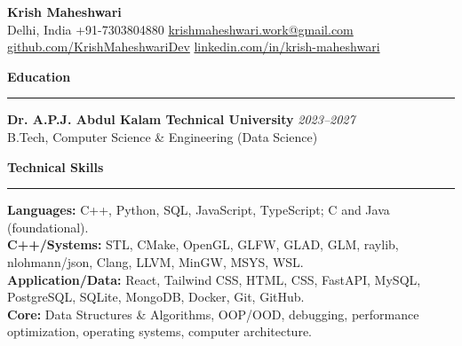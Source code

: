 \documentclass[11pt,a4paper]{article}
\newcommand{\sectionline}[1]{\vspace{6pt}\textbf{#1}\par\vspace{2pt}\hrule\vspace{3pt}}
\begin{document}
\pagestyle{empty}
\raggedright

{\Large\textbf{Krish Maheshwari}}\\
Delhi, India \textbar{} +91-7303804880 \textbar{} \href{mailto:krishmaheshwari.work@gmail.com}{krishmaheshwari.work@gmail.com}\\
\href{https://github.com/KrishMaheshwariDev/}{github.com/KrishMaheshwariDev} \textbar{} \href{https://www.linkedin.com/in/krish-maheshwari/}{linkedin.com/in/krish-maheshwari}

\sectionline{Education}
\textbf{Dr. A.P.J. Abdul Kalam Technical University} \hfill \textit{2023--2027}\\
B.Tech, Computer Science \& Engineering (Data Science)

\sectionline{Technical Skills}
\textbf{Languages:} C++, Python, SQL, JavaScript, TypeScript; C and Java (foundational).\\
\textbf{C++/Systems:} STL, CMake, OpenGL, GLFW, GLAD, GLM, raylib, nlohmann/json, Clang, LLVM, MinGW, MSYS, WSL.\\
\textbf{Application/Data:} React, Tailwind CSS, HTML, CSS, FastAPI, MySQL, PostgreSQL, SQLite, MongoDB, Docker, Git, GitHub.\\
\textbf{Core:} Data Structures \& Algorithms, OOP/OOD, debugging, performance optimization, operating systems, computer architecture.
\end{document}
